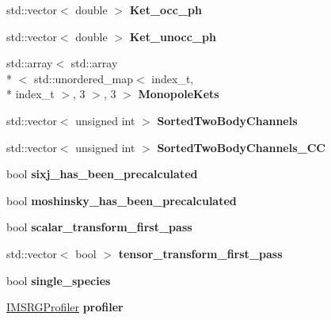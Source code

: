 \begin{DoxyCompactItemize}
\item 
\hypertarget{classModelSpace_ab1f59a2ff19f05614944ed25e6a9d138}{std\-::vector$<$ double $>$ {\bfseries Ket\-\_\-occ\-\_\-ph}}\label{classModelSpace_ab1f59a2ff19f05614944ed25e6a9d138}

\item 
\hypertarget{classModelSpace_a6725304848dbc7700eae014f7b58939d}{std\-::vector$<$ double $>$ {\bfseries Ket\-\_\-unocc\-\_\-ph}}\label{classModelSpace_a6725304848dbc7700eae014f7b58939d}

\item 
\hypertarget{classModelSpace_acd3448352c763363693f9730cc95d4a1}{std\-::array$<$ std\-::array\\*
$<$ std\-::unordered\-\_\-map$<$ index\-\_\-t, \\*
index\-\_\-t $>$, 3 $>$, 3 $>$ {\bfseries Monopole\-Kets}}\label{classModelSpace_acd3448352c763363693f9730cc95d4a1}

\item 
\hypertarget{classModelSpace_a8a49aa276b035647cc25a19c4362d8ba}{std\-::vector$<$ unsigned int $>$ {\bfseries Sorted\-Two\-Body\-Channels}}\label{classModelSpace_a8a49aa276b035647cc25a19c4362d8ba}

\item 
\hypertarget{classModelSpace_af009fd2acaada10b6a4380153a6c79cb}{std\-::vector$<$ unsigned int $>$ {\bfseries Sorted\-Two\-Body\-Channels\-\_\-\-C\-C}}\label{classModelSpace_af009fd2acaada10b6a4380153a6c79cb}

\item 
\hypertarget{classModelSpace_add8f51396475dd1c0035a1a9e6e6f452}{bool {\bfseries sixj\-\_\-has\-\_\-been\-\_\-precalculated}}\label{classModelSpace_add8f51396475dd1c0035a1a9e6e6f452}

\item 
\hypertarget{classModelSpace_a4efe26f443e19138189e8934c7eda80c}{bool {\bfseries moshinsky\-\_\-has\-\_\-been\-\_\-precalculated}}\label{classModelSpace_a4efe26f443e19138189e8934c7eda80c}

\item 
\hypertarget{classModelSpace_ab871d46ec0a635ed4816e99cbe5bb573}{bool {\bfseries scalar\-\_\-transform\-\_\-first\-\_\-pass}}\label{classModelSpace_ab871d46ec0a635ed4816e99cbe5bb573}

\item 
\hypertarget{classModelSpace_a1319e368bcbc377096bf22e8752bee4a}{std\-::vector$<$ bool $>$ {\bfseries tensor\-\_\-transform\-\_\-first\-\_\-pass}}\label{classModelSpace_a1319e368bcbc377096bf22e8752bee4a}

\item 
\hypertarget{classModelSpace_af44ce4419b84bad23f1403de48fd1276}{bool {\bfseries single\-\_\-species}}\label{classModelSpace_af44ce4419b84bad23f1403de48fd1276}

\item 
\hypertarget{classModelSpace_a9d5b193fe45f361371beb818bfe00fd3}{\hyperlink{classIMSRGProfiler}{I\-M\-S\-R\-G\-Profiler} {\bfseries profiler}}\label{classModelSpace_a9d5b193fe45f361371beb818bfe00fd3}

\end{DoxyCompactItemize}

